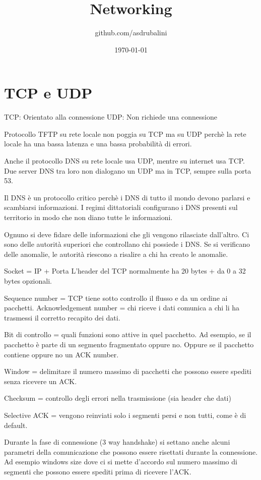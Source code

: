 \documentclass{article}
\title{Networking}
\author{github.com/asdrubalini}
\date{\today}
\begin{document}
    \maketitle

    \section{TCP e UDP}
    TCP: Orientato alla connessione
    UDP: Non richiede una connessione

    Protocollo TFTP su rete locale non poggia su TCP ma su UDP perchè la rete locale ha una bassa latenza e una bassa probabilità di errori.

    Anche il protocollo DNS su rete locale usa UDP, mentre su internet usa TCP.
    Due server DNS tra loro non dialogano un UDP ma in TCP, sempre sulla porta 53.

    Il DNS è un protocollo critico perchè i DNS di tutto il mondo devono parlarsi e scambiarsi informazioni. I regimi dittatoriali configurano i DNS presenti sul territorio in modo che non diano tutte le informazioni.

    Ognuno si deve fidare delle informazioni che gli vengono rilasciate dall'altro.
    Ci sono delle autorità superiori che controllano chi possiede i DNS. Se si verificano delle anomalie, le autorità riescono a risalire a chi ha creato le anomalie.

    Socket = IP + Porta
    L'header del TCP normalmente ha 20 bytes + da 0 a 32 bytes opzionali.

    Sequence number = TCP tiene sotto controllo il flusso e da un ordine ai pacchetti.
    Acknowledgement number = chi riceve i dati comunica a chi li ha trasmessi il corretto recapito dei dati.

    Bit di controllo = quali funzioni sono attive in quel pacchetto. Ad esempio, se il pacchetto è parte di un segmento fragmentato oppure no. Oppure se il pacchetto contiene oppure no un ACK number.

    Window = delimitare il numero massimo di pacchetti che possono essere spediti senza ricevere un ACK.

    Checksum = controllo degli errori nella trasmissione (sia header che dati)

    Selective ACK = vengono reinviati solo i segmenti persi e non tutti, come è di default.

    Durante la fase di connessione (3 way handshake) si settano anche alcuni parametri della comunicazione che possono essere risettati durante la connessione. Ad esempio windows size dove ci si mette d'accordo sul numero massimo di segmenti che possono essere spediti prima di ricevere l'ACK.
\end{document}
